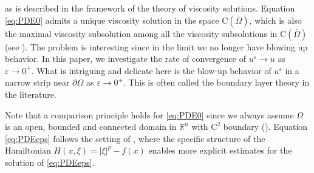 \documentclass[12pt,reqno]{amsart}
\numberwithin{figure}{section}
\theoremstyle{plain}
\theoremstyle{remark}
\numberwithin{equation}{section}
\newcommand{\rmC}{\mathrm{C}}
\begin{document}
as is described in the framework of the theory of viscosity solutions. Equation \eqref{eq:PDE0} admits a unique viscosity solution in the space $\rmC(\overline{\Omega})$, which is also the maximal viscosity subsolution among all the viscosity subsolutions in $\rmC(\overline{\Omega})$(see \cite{Capuzzo-Dolcetta1990,Soner1986}). The problem is interesting since in the limit we no longer have blowing up behavior. In this paper, we investigate the rate of convergence of $u^\varepsilon \to u$ as $\varepsilon\to 0^+$. What is intriguing and delicate here is the blow-up behavior of $u^\varepsilon$ in a narrow strip near $\partial \Omega$ as $\varepsilon\to 0^+$. This is often called the boundary layer theory in the literature.


Note that a comparison principle holds for \eqref{eq:PDE0} since we always assume $\Omega$ is an open, bounded and connected domain in $\mathbb{R}^n$ with $\mathrm{C}^2$ boundary (\cite{Capuzzo-Dolcetta1990,Soner1986}). Equation \eqref{eq:PDEeps} follows the setting of \cite{Lasry1989}, where the specific structure of the Hamiltonian $H(x,\xi) = |\xi|^p - f(x)$ enables more explicit estimates for the solution of \eqref{eq:PDEeps}.


\end{document}
